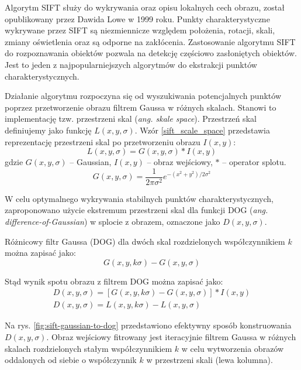 Algorytm SIFT służy do wykrywania oraz opisu lokalnych cech obrazu, został opublikowany przez Dawida Lowe w 1999 roku.\cite{SIFT99} Punkty charakterystyczne wykrywane przez SIFT są niezmiennicze względem położenia, rotacji, skali, zmiany oświetlenia oraz są odporne na zakłócenia. Zastosowanie algorytmu SIFT do rozpoznawania obiektów pozwala na detekcję częściowo zasłoniętych obiektów. Jest to jeden z najpopularniejszych algorytmów do ekstrakcji punktów charakterystycznych.

Działanie algorytmu rozpoczyna się od wyszukiwania potencjalnych punktów poprzez przetworzenie obrazu filtrem Gaussa w różnych skalach. Stanowi to implementację tzw. przestrzeni skal (\emph{ang. skale space}). Przestrzeń skal definiujemy jako funkcję $L(x, y, \sigma)$. Wzór \ref{sift_scale_space} przedstawia reprezentację przestrzeni skal po przetworzeniu obrazu $I(x, y)$:
\begin{equation} 
\label{sift_scale_space} 
L(x, y, \sigma) = G(x, y, \sigma) \ast I(x, y)
\end{equation} gdzie $G(x, y, \sigma)$ -- Gaussian, $I(x, y)$ -- obraz wejściowy, $\ast$ -- operator splotu.
\begin{equation} 
\label{sift_gaussian} 
G(x, y, \sigma) = \frac{1}{2\pi\sigma^2}e^{-(x^2+y^2)/2\sigma^2}
\end{equation} 

W celu optymalnego wykrywania stabilnych punktów charakterystycznych, zaproponowano użycie ekstremum przestrzeni skal dla funkcji DOG (\emph{ang. difference-of-Gaussian}) w splocie z obrazem, oznaczone jako $D(x, y, \sigma)$.

Różnicowy filtr Gaussa (DOG) dla dwóch skal rozdzielonych współczynnikiem $k$ można zapisać jako:
\begin{equation} 
\label{sift_dog} 
G(x, y, k\sigma) - G(x, y, \sigma) 
\end{equation} 

Stąd wynik spotu obrazu z filtrem DOG można zapisać jako:
\begin{equation} 
\label{sift_splot} 
	\begin{gathered}
		D(x, y, \sigma) = [G(x, y, k\sigma) - G(x, y, \sigma)] \ast I(x, y) \\
		D(x, y, \sigma) = L(x, y, k\sigma) - L(x, y, \sigma)
	\end{gathered}
\end{equation}

Na rys. \ref{fig:sift-gaussian-to-dog} przedstawiono efektywny sposób konstruowania $D(x, y, \sigma)$. Obraz wejściowy fitrowany jest iteracyjnie filtrem Gaussa w różnych skalach rozdzielonych stałym współczynnikiem $k$ w celu wytworzenia obrazów oddalonych od siebie o współczynnik $k$ w przestrzeni skali (lewa kolumna).

